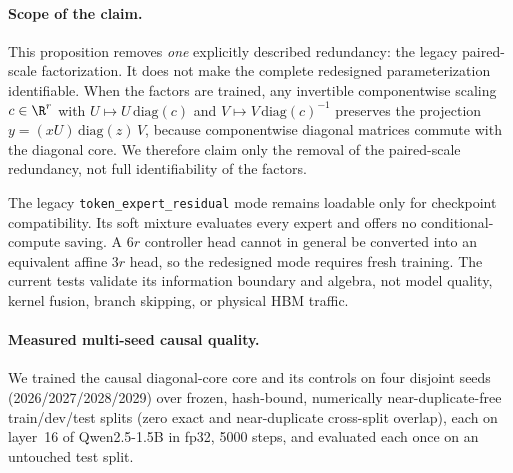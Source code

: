 \paragraph{Scope of the claim.}
This proposition removes \emph{one} explicitly described redundancy: the
legacy paired-scale factorization.  It does not make the complete redesigned
parameterization identifiable.  When the factors are trained, any invertible
componentwise scaling $c\in\R^{r}$ with $U\mapsto U\,\mathrm{diag}(c)$ and
$V\mapsto V\,\mathrm{diag}(c)^{-1}$ preserves the projection
$y=(xU)\,\mathrm{diag}(z)\,V$, because componentwise diagonal matrices commute
with the diagonal core.  We therefore claim only the removal of the paired-scale
redundancy, not full identifiability of the factors.

The legacy \texttt{token\_expert\_residual} mode remains loadable only for
checkpoint compatibility.  Its soft mixture evaluates every expert and offers
no conditional-compute saving.  A $6r$ controller head cannot in general be
converted into an equivalent affine $3r$ head, so the redesigned mode requires
fresh training.  The current tests validate its information boundary and
algebra, not model quality, kernel fusion, branch skipping, or physical HBM
traffic.

\paragraph{Measured multi-seed causal quality.}
We trained the causal diagonal-core core and its controls on four disjoint
seeds (2026/2027/2028/2029) over frozen, hash-bound, numerically near-duplicate-free
train/dev/test splits (zero exact and near-duplicate cross-split overlap),
each on layer~16 of Qwen2.5-1.5B \cite{qwen2025qwen25} in fp32, 5000 steps,
and evaluated each once
on an untouched test split.
